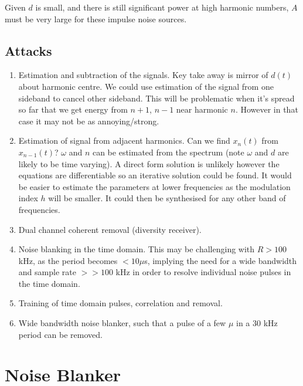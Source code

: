 \documentclass{article}
\begin{document}
Given $d$ is small, and there is still significant power at high harmonic numbers, $A$ must be very large for these impulse noise sources.

\subsection{Attacks}

\begin{enumerate}
\item Estimation and subtraction of the signals. Key take away is mirror of $d(t)$ about harmonic centre.  We could use estimation of the signal from one sideband to cancel other sideband. This will be problematic when it's spread so far that we get energy from $n+1$, $n-1$ near harmonic $n$.  However in that case it may not be as annoying/strong.

\item Estimation of signal from adjacent harmonics.  Can we find $x_n(t)$ from $x_{n-1}(t)$?  $\omega$ and $n$ can be estimated from the spectrum (note $\omega$ and $d$ are likely to be time varying). A direct form solution is unlikely however the equations are differentiable so an iterative solution could be found.  It would be easier to estimate the parameters at lower frequencies as the modulation index $h$ will be smaller.  It could then be synthesised for any other band of frequencies. 

\item Dual channel coherent removal (diversity receiver).

\item Noise blanking in the time domain.  This may be challenging with $R>100$ kHz, as the period becomes $< 10\mu$s, implying the need for a wide bandwidth and sample rate $>>100$ kHz in order to resolve individual noise pulses in the time domain.

\item Training of time domain pulses, correlation and removal.

\item Wide bandwidth noise blanker, such that a pulse of a few $\mu$ in a 30 kHz period can be removed.

\end{enumerate}

\section{Noise Blanker}
\label{blanker}
\end{document}
